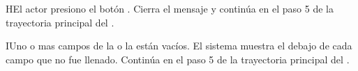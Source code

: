 \begin{UCtrayectoriaA}{H}{El actor presiono el botón .}
	\UCpaso Cierra el mensaje y continúa en el paso 5 de la trayectoria principal del .	
\end{UCtrayectoriaA}
\begin{UCtrayectoriaA}{I}{Uno o mas campos de la  o la  están vacíos.}
	\UCpaso El sistema muestra el  debajo de cada campo que no fue llenado. 
	\UCpaso	Continúa en el paso 5 de la trayectoria principal del .
\end{UCtrayectoriaA}